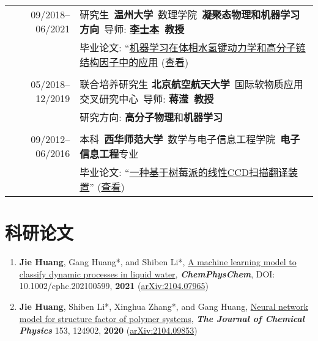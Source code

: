 \documentclass[a4paper,10pt]{article} %
\begin{document}
\begin{tabular}{r|l}	

09/2018--06/2021 				    &研究生\ \textbf{温州大学}\ 数理学院\  \textbf{凝聚态物理和机器学习方向}\ 导师: \textbf{\href{http://slxy.wzu.edu.cn/lsb.pdf}{李士本}\ 教授}\\
                                    & 毕业论文: “\href{https://nbviewer.jupyter.org/github/HuangJiaLian/DataBase0/blob/master/uPic/2021_07_24_12_HuangJieBiYeDaBian.pdf}{机器学习在体相水氢键动力学和高分子链结构因子中的应用} (\href{http://nbviewer.jupyter.org/github/HuangJiaLian/DataBase0/blob/master/uPic/2021_07_24_01_ms_thesis.pdf}{查看})\\

\multicolumn{2}{c}{} \\	%

05/2018--12/2019            & 联合培养研究生 \textbf{北京航空航天大学}\ 国际软物质应用交叉研究中心\ 导师: \textbf{蒋滢\ 教授}  \\	
& 研究方向: \textbf{高分子物理}和\textbf{机器学习}\\

\multicolumn{2}{c}{} \\	%

09/2012--06/2016                    & 本科\ \textbf{西华师范大学}\ 数学与电子信息工程学院\ \textbf{电子信息工程}专业 \\
					 & 毕业论文: “\href{https://nbviewer.jupyter.org/github/HuangJiaLian/DataBase0/blob/master/uPic/2021_07_24_13_CCD_translation_device.pdf}{一种基于树莓派的线性CCD扫描翻译装置}” (\href{https://nbviewer.jupyter.org/github/HuangJiaLian/DataBase0/blob/master/uPic/CCD_Translation_Machine.pdf}{查看})\
\end{tabular}

\section{科研论文}  
\begin{small}
	\begin{enumerate}
		\item \textbf{Jie Huang}, Gang Huang*, and Shiben Li*, \href{https://chemistry-europe.onlinelibrary.wiley.com/doi/abs/10.1002/cphc.202100599}{A machine learning model to classify dynamic processes in liquid water},   \textbf{\emph{ChemPhysChem}}, DOI: 10.1002/cphc.202100599,\textbf{ 2021} (\href{https://arxiv.org/abs/2104.07965}{arXiv:2104.07965})
		
		\item \textbf{Jie Huang}, Shiben Li*, Xinghua Zhang*, and Gang Huang, \href{https://aip.scitation.org/doi/10.1063/5.0022464}{Neural network model for structure factor of polymer systems},  \textbf{\emph{The Journal of Chemical Physics}} 153, 124902, \textbf{2020} (\href{https://arxiv.org/abs/2104.09853}{arXiv:2104.09853})
	\end{enumerate}
\end{small}
\end{document}
